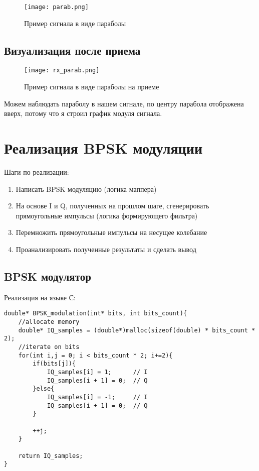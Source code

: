 \begin{figure}[H]
    \centering
    \texttt{[image: parab.png]}
    \caption{Пример сигнала в виде параболы}
\end{figure}

\subsection*{\textbf{Визуализация после приема}}

\begin{figure}[H]
    \centering
    \texttt{[image: rx\_parab.png]}
    \caption{Пример сигнала в виде параболы на приеме}
\end{figure}

Можем наблюдать параболу в нашем сигнале, по центру парабола отображена вверх, потому что я строил график модуля сигнала.

\section*{\textbf{Реализация BPSK модуляции}}

Шаги по реализации:

\begin{enumerate}
    \item Написать BPSK модуляцию (логика маппера)
    \item На основе I и Q, полученных на прошлом шаге, сгенерировать прямоугольные импульсы (логика формирующего фильтра)
    \item Перемножить прямоугольные импульсы на несущее колебание
    \item Проанализировать полученные результаты и сделать вывод
\end{enumerate}

\subsection*{\textbf{BPSK модулятор}}

Реализация на языке С:

\begin{lstlisting}
double* BPSK_modulation(int* bits, int bits_count){
    //allocate memory
    double* IQ_samples = (double*)malloc(sizeof(double) * bits_count * 2);
    //iterate on bits
    for(int i,j = 0; i < bits_count * 2; i+=2){
        if(bits[j]){
            IQ_samples[i] = 1;      // I
            IQ_samples[i + 1] = 0;  // Q
        }else{
            IQ_samples[i] = -1;     // I
            IQ_samples[i + 1] = 0;  // Q
        }

        ++j;
    }

    return IQ_samples;
}
\end{lstlisting}

